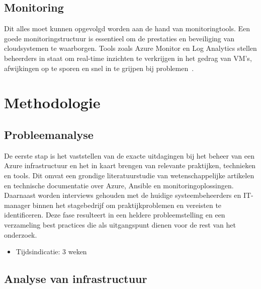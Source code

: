 \subsection{Monitoring}%

Dit alles moet kunnen opgevolgd worden aan de hand van monitoringtools. Een goede monitoringstructuur is essentieel om de prestaties en beveiliging van cloudsystemen te waarborgen.
Tools zoals Azure Monitor en Log Analytics stellen beheerders in staat om real-time inzichten te verkrijgen in het gedrag van VM's, afwijkingen op te sporen en snel in te grijpen bij problemen~\autocite{Microsoft2024Monitor}.


\section{Methodologie}%
\label{sec:methodologie}

\subsection{Probleemanalyse}%

De eerste stap is het vaststellen van de exacte uitdagingen bij het beheer van een Azure infrastructuur en het in kaart brengen van relevante praktijken, technieken en tools.
Dit omvat een grondige literatuurstudie van wetenschappelijke artikelen en technische documentatie over Azure, Ansible en monitoringoplossingen.
Daarnaast worden interviews gehouden met de huidige systeembeheerders en IT-manager binnen het stagebedrijf om praktijkproblemen en vereisten te identificeren.
Deze fase resulteert in een heldere probleemstelling en een verzameling best practices die als uitgangspunt dienen voor de rest van het onderzoek.

\begin{itemize}
  \item Tijdsindicatie: 3 weken
\end{itemize}

\subsection{Analyse van infrastructuur}%

